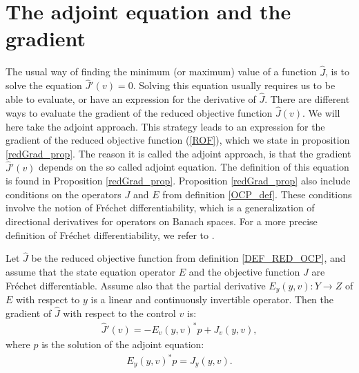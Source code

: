\section{The adjoint equation and the gradient} \label{adjointGrad_sec}
The usual way of finding the minimum (or maximum) value of a function $\hat J$, is to solve the equation $\hat J'(v)=0$. Solving this equation usually requires us to be able to evaluate, or have an expression for the derivative of $\hat J$. There are different ways to evaluate the gradient of the reduced objective function $\hat J(v)$. We will here take the adjoint approach. This strategy leads to an expression for the gradient of the reduced objective function (\ref{ROF}), which we state in proposition \ref{redGrad_prop}. The reason it is called the adjoint approach, is that the gradient $\hat J'(v)$ depends on the so called adjoint equation. The definition of this equation is found in Proposition \ref{redGrad_prop}. Proposition \ref{redGrad_prop} also include conditions on the operators $J$ and $E$ from definition \ref{OCP_def}. These conditions involve the notion of Fr\'{e}chet differentiability, which is a generalization of directional derivatives for operators on Banach spaces. For a more precise definition of Fr\'{e}chet differentiability, we refer to \cite{hinze2008optimization}.
\begin{proposition} \label{redGrad_prop}
Let $\hat J$ be the reduced objective function from definition \ref{DEF_RED_OCP}, and assume that the state equation operator $E$ and the objective function $J$ are Fr\'{e}chet differentiable. Assume also that the partial derivative $E_y(y,v):Y\rightarrow Z$ of $E$ with respect to $y$ is a linear and continuously invertible operator. Then the gradient of $\hat J$ with respect to the control $v$ is:
\begin{align}
\hat J'(v) = -E_v(y,v)^*p + J_v(y,v),\label{gradient}
\end{align}
where $p$ is the solution of the adjoint equation:
\begin{align}
E_y(y,v)^{*}p=J_y(y,v). \label{general adjoint}
\end{align}
\end{proposition}
